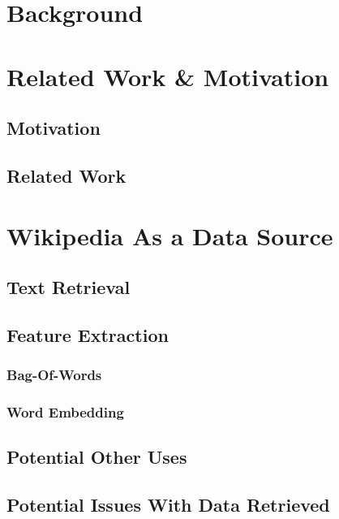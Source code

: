 \documentclass[bsc,frontabs,twoside,singlespacing,parskip,deptreport]{infthesis}     %
\begin{document}
\chapter{Background}

\chapter{Related Work \& Motivation}
\section{Motivation}
\section{Related Work}


\chapter{Wikipedia As a Data Source}
\section{Text Retrieval}
\section{Feature Extraction}
\subsection{Bag-Of-Words}
\subsection{Word Embedding}
\section{Potential Other Uses}
\section{Potential Issues With Data Retrieved}

\end{document}
